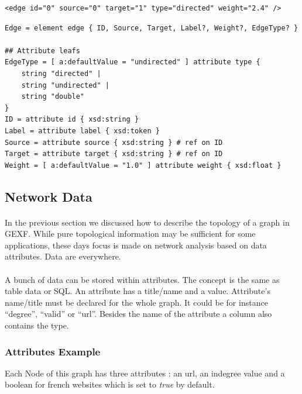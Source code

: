 \documentclass[a4paper,10pt]{article}
\begin{document}
\lstset{ style=gexf }
\begin{lstlisting}[caption={A more complete edge},label=aMoreEdge]
<edge id="0" source="0" target="1" type="directed" weight="2.4" />
\end{lstlisting}

\lstset{ style=rnc }
\begin{lstlisting}[caption={Edge Specification},label=edgeRNC]
Edge = element edge { ID, Source, Target, Label?, Weight?, EdgeType? }

## Attribute leafs
EdgeType = [ a:defaultValue = "undirected" ] attribute type {
    string "directed" |
    string "undirected" |
    string "double"
}
ID = attribute id { xsd:string }
Label = attribute label { xsd:token }
Source = attribute source { xsd:string } # ref on ID
Target = attribute target { xsd:string } # ref on ID
Weight = [ a:defaultValue = "1.0" ] attribute weight { xsd:float }
\end{lstlisting}

\subsection{Network Data} \label{networkdata}

\paragraph{}
In the previous section we discussed how to describe the topology of a graph in GEXF. While pure topological information may be sufficient for some applications, these days focus is made on network analysis based on data attributes. Data are everywhere.

\paragraph{}
A bunch of data can be stored within attributes. The concept is the same as table data or SQL. An attribute has a title/name and a value. Attribute’s name/title must be declared for the whole graph. It could be for instance “degree”, “valid” or “url”. Besides the name of the attribute a column also contains the type.


\subsubsection{Attributes Example}

Each Node of this graph has three attributes : an url, an indegree value and a boolean for french websites which is set to \textit{true} by default.
\end{document}
